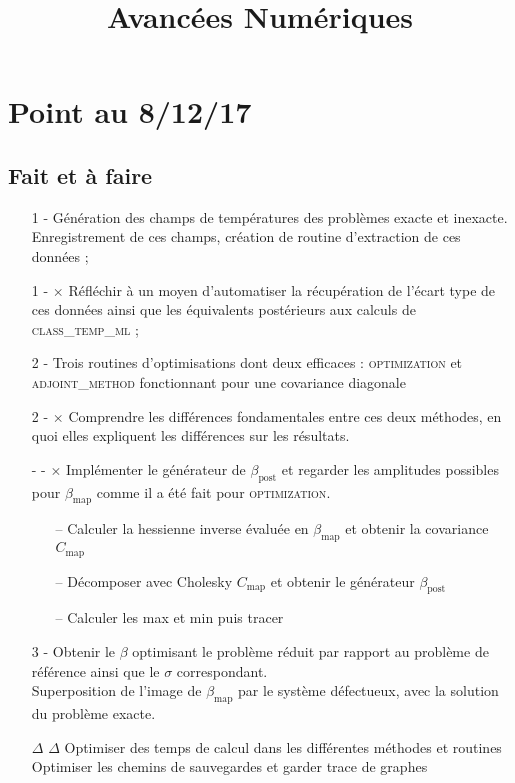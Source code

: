 \documentclass[a4paper,12pt]{article}
\title{Avancées Numériques}%
\date{}
\newcommand\bk{\color{black}}
\newcommand\navy{\color{navy}}
\newcommand{\done}{\color{green} \textbf{\checkmark} \color{black}}
\newcommand{\todo}{\color{red} \textbf{$\times$} \color{black}}
\newcommand{\warn}{\color{orange} \textbf{$\Delta$} \color{black}}
\numberwithin{equation}{section} %
\begin{document}
\maketitle
\section*{Point au 8/12/17}
\navy \subsection*{Fait et à faire } \bk
\begin{itemize}
	\item[1 - \done] Génération des champs de températures des problèmes exacte et inexacte. Enregistrement de ces champs, création de routine d'extraction de ces données ;
	\item[1 - \todo] Réfléchir à un moyen d'automatiser la récupération de l'écart type de ces données ainsi que les équivalents postérieurs aux calculs de \textsc{class\_temp\_ml} ; \\

	\item[2 - \done] Trois routines d'optimisations dont deux efficaces : \textsc{optimization} et \textsc{adjoint\_method} fonctionnant pour une covariance diagonale
	\item[2 - \todo] Comprendre les différences fondamentales entre ces deux méthodes, en quoi elles expliquent les différences sur les résultats.
	\item[- - \todo] Implémenter le générateur de $\beta_{\text{post}}$ et regarder les amplitudes possibles pour $\beta_{\text{map}}$ comme il a été fait pour \textsc{optimization}.
	\begin{itemize}
		\item[--] Calculer la hessienne inverse évaluée en $\beta_{\text{map}} $ et obtenir la covariance $C_{\text{map}}$
		\item[--] Décomposer avec Cholesky $C_{\text{map}}$ et obtenir le générateur $\beta_{\text{post}}$
		\item[--] Calculer les max et min puis tracer  \\
	\end{itemize}
	
	\item[3 - \done] Obtenir le $\beta$ optimisant le problème réduit par rapport au problème de référence ainsi que le $\sigma$ correspondant. \\
	Superposition de l'image de $\beta_{\text{map}}$ par le système défectueux, avec la solution du problème exacte. \\
	
	\item[\warn \warn] Optimiser des temps de calcul dans les différentes méthodes et routines \\
	Optimiser les chemins de sauvegardes et garder trace de graphes
	
\end{itemize}
\end{document}
